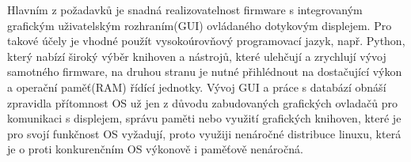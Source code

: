 %

Hlavním z požadavků je snadná realizovatelnost firmware s integrovaným grafickým uživatelským rozhraním(GUI) ovládaného dotykovým displejem. Pro takové účely je vhodné použít vysokoúrovňový programovací jazyk, např. Python, který nabízí široký výběr knihoven a nástrojů, které ulehčují a zrychlují vývoj samotného firmware, na druhou stranu je nutné přihlédnout na dostačující výkon a operační paměť(RAM) řídící jednotky. Vývoj GUI a práce s databází obnáší zpravidla přítomnost OS už jen z důvodu zabudovaných grafických ovladačů pro komunikaci s displejem, správu paměti nebo využití grafických knihoven, které je pro svojí funkčnost OS vyžadují, proto využiji nenáročné distribuce linuxu, která je o proti konkurenčním OS výkonově i paměťově nenáročná.

